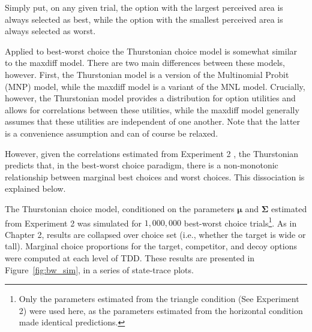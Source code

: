Simply put, on any given trial, the option with the largest perceived area is always selected as best, while the option with the smallest perceived area is always selected as worst. 

Applied to best-worst choice the Thurstonian choice model is somewhat similar to the maxdiff model. There are two main differences between these models, however. First, the Thurstonian model is a version of the Multinomial Probit (MNP) model, while the maxdiff model is a variant of the MNL model. Crucially, however, the Thurstonian model provides a distribution for option utilities and allows for correlations between these utilities, while the maxdiff model generally assumes that these utilities are independent of one another. Note that the latter is a convenience assumption and can of course be relaxed.

However, given the correlations estimated from Experiment 2 , the Thurstonian predicts that, in the best-worst choice paradigm, there is a non-monotonic relationship between marginal best choices and worst choices. This dissociation is explained below.

The Thurstonian choice model, conditioned on the parameters $\boldsymbol{\mu}$ and $\boldsymbol{\Sigma}$ estimated from Experiment 2 was simulated for $1,000,000$ best-worst choice trials\footnote{Only the parameters estimated from the triangle condition (See Experiment 2) were used here, as the parameters estimated from the horizontal condition made identical predictions.}. As in Chapter 2, results are collapsed over choice set (i.e., whether the target is wide or tall). Marginal choice proportions for the target, competitor, and decoy options were computed at each level of TDD. These results are presented in Figure~\ref{fig:bw_sim}, in a series of state-trace plots.

